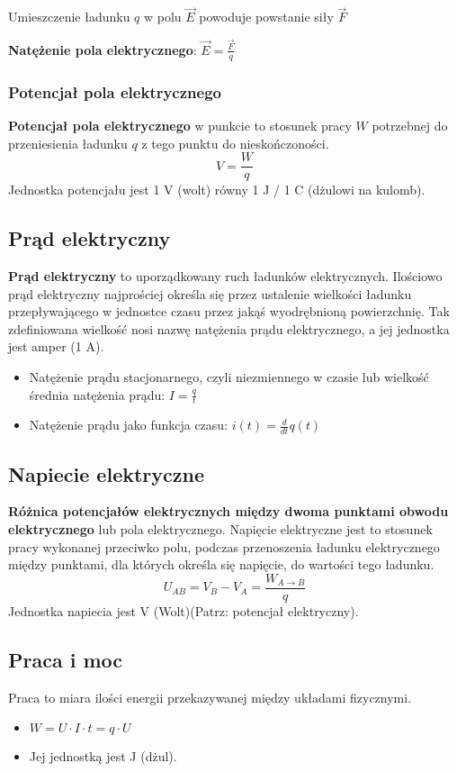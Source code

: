 \documentclass{article}
\begin{document}
Umieszczenie ładunku \(q\) w polu \(\vec{E}\) powoduje powstanie siły $\vec{F}$

\textbf{Natężenie pola elektrycznego}: $\vec{E} = \frac{\vec{F}}{q}$

\subsubsection{Potencjał pola elektrycznego}
\textbf{Potencjał pola elektrycznego} w punkcie to stosunek pracy $W$ potrzebnej do przeniesienia ładunku $q$ z tego punktu do nieskończoności.
$$V = \frac{W}{q}$$
Jednostka potencjału jest 1 V (wolt) równy 1 J / 1 C (dżulowi na kulomb).

\subsection{Prąd elektryczny}
\textbf{Prąd elektryczny} to uporządkowany ruch ładunków elektrycznych. Ilościowo prąd elektryczny najprościej określa się przez ustalenie wielkości ładunku przepływającego w jednostce czasu przez jakąś wyodrębnioną powierzchnię. Tak zdefiniowana wielkość nosi nazwę natężenia prądu elektrycznego, a jej jednostka jest amper (1 A).
\begin{itemize}
\item Natężenie prądu stacjonarnego, czyli niezmiennego w czasie lub wielkość średnia natężenia prądu: $I=\frac{q}{t}$
\item Natężenie prądu jako funkcja czasu: $i(t)=\frac{d}{dt}q(t)$
\end{itemize}

\subsection{Napiecie elektryczne}
\textbf{Różnica potencjałów elektrycznych między dwoma punktami obwodu elektrycznego} lub pola elektrycznego. Napięcie elektryczne jest to stosunek pracy wykonanej przeciwko polu, podczas przenoszenia ładunku elektrycznego między punktami, dla których określa się napięcie, do wartości tego ładunku.
$$U_{AB} = V_B - V_A = \frac{W_{A \rightarrow B}}{q}$$
Jednostka napiecia jest V (Wolt)(Patrz: potencjał elektryczny).

\subsection{Praca i moc}
Praca to miara ilości energii przekazywanej między układami fizycznymi.
\begin{itemize}
\item $W = U \cdot I \cdot t = q \cdot U$
\item Jej jednostką jest J (dżul).
\end{itemize}
\end{document}
